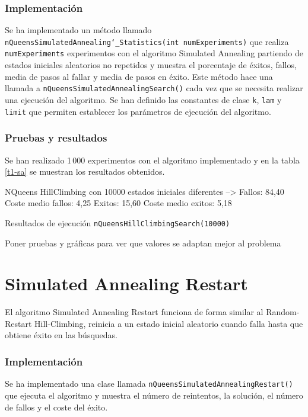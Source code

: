 \documentclass[..main.tex]{subfiles}
\begin{document}
\subsubsection{Implementación}
Se ha implementado un método llamado \texttt{nQueensSimulatedAnnealing\char`_Statistics(int numExperiments)} que realiza \texttt{numExperiments} experimentos con el algoritmo  Simulated Annealing partiendo de estados iniciales aleatorios no repetidos y muestra el porcentaje de éxitos, fallos, media de pasos al fallar y media de pasos en éxito. Este método hace una llamada a \texttt{nQueensSimulatedAnnealingSearch()} cada vez que se necesita realizar una ejecución del algoritmo. Se han definido las constantes de clase \texttt{k}, \texttt{lam} y \texttt{limit} que permiten establecer los parámetros de ejecución del algoritmo.

\subsubsection{Pruebas y resultados}
Se han realizado 1\,000 experimentos con el algoritmo implementado y en la tabla \ref{t1-sa} se muestran los resultados obtenidos.

\begin{table}[h]
\centering
\begin{LVerbatim}[frame=single]
NQueens HillClimbing con 10000 estados iniciales diferentes  -->
Fallos: 84,40
Coste medio fallos: 4,25
Exitos: 15,60
Coste medio exitos: 5,18
 \end{LVerbatim}
      \caption{\label{t1-sa} Resultados de ejecución \texttt{nQueensHillClimbingSearch(10000)}}
\end{table}

Poner pruebas y gráficas para ver que valores se adaptan mejor al problema

\section{Simulated Annealing Restart}
El algoritmo Simulated Annealing Restart  funciona de forma similar al Random-Restart Hill-Climbing, reinicia a un estado inicial aleatorio cuando falla hasta que obtiene éxito en las búsquedas.

\subsubsection{Implementación}
Se ha implementado una clase llamada \texttt{nQueensSimulatedAnnealingRestart()} que ejecuta el algoritmo y muestra el número de reintentos, la solución, el número de fallos y el coste del éxito.
\end{document}
